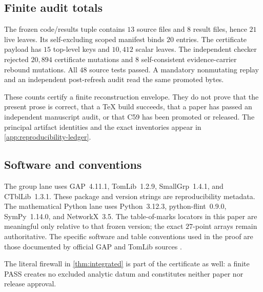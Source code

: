 \subsection{Finite audit totals}

The frozen code/results tuple contains $13$ source files and $8$ result
files, hence $21$ live leaves.  Its self-excluding scoped manifest binds $20$
entries.  The certificate payload has $15$ top-level keys and $10{,}412$
scalar leaves.  The independent checker rejected $20{,}894$ certificate
mutations and $8$ self-consistent evidence-carrier rebound mutations.  All
$48$ source tests passed.  A mandatory nonmutating replay and an independent
post-refresh audit read the same promoted bytes.

These counts certify a finite reconstruction envelope.  They do not prove
that the present prose is correct, that a TeX build succeeds, that a paper
has passed an independent manuscript audit, or that C59 has been promoted or
released.  The
principal artifact identities and the exact inventories appear in
\cref{app:reproducibility-ledger}.

\subsection{Software and conventions}

The group lane uses GAP~4.11.1, TomLib~1.2.9, SmallGrp~1.4.1, and
CTblLib~1.3.1.  These package and version strings are reproducibility
metadata.  The mathematical Python lane uses Python~3.12.3,
python-flint~0.9.0, SymPy~1.14.0, and NetworkX~3.5.  The table-of-marks
locators in this paper are meaningful only relative to that frozen version;
the exact $27$-point arrays remain authoritative.  The specific software and
table conventions used in the proof are those documented by official GAP and
TomLib sources
\citep{gap2021,tomlib2019}.

The literal firewall in \cref{thm:integrated} is part of the certificate as
well: a finite PASS creates no excluded analytic datum and constitutes
neither paper nor release approval.
